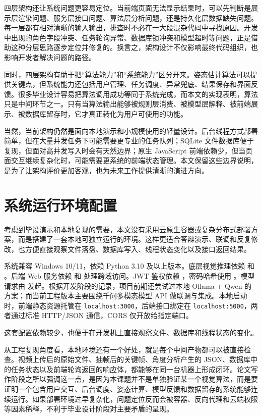 四层架构还让系统问题更容易定位。当前端页面无法显示结果时，可以先判断是展示层渲染问题、服务层接口问题、算法层分析问题，还是持久化层数据缺失问题。每一层都有相对清晰的输入输出，排查时不必在一大段混杂代码中寻找原因。开发中出现的角色字段冲突、任务轮询异常、数据库锁冲突和模型超时等问题，正是借助这种分层思路逐步定位并修复的。换言之，架构设计不仅影响最终代码组织，也影响开发者解决问题的路径。

同时，四层架构有助于把“算法能力”和“系统能力”区分开来。姿态估计算法可以提供关键点，但系统能力还包括用户管理、任务调度、异常兜底、结果保存和界面反馈。很多毕业设计容易把算法调用成功等同于系统完成，而本文的实现表明，算法只是中间环节之一。只有当算法输出能够被规则层消费、被模型层解释、被前端展示、被数据库留存时，它才真正转化为用户可使用的功能。

当然，当前架构仍然是面向本地演示和小规模使用的轻量设计。后台线程方式部署简单，但在大量并发任务下可能需要更专业的任务队列；SQLite 文件数据库便于复现，但面对高并发写入时会有天然边界；原生 JavaScript 前端依赖少，但当页面交互继续复杂化时，可能需要更系统的前端状态管理。本文保留这些边界说明，是为了让架构评价更加客观，也为未来工作提供清晰的演进方向。

\section{系统运行环境配置}
考虑到毕设演示和本地复现的需要，本文没有采用云原生容器或复杂分布式部署方案，而是搭建了一套本地可独立运行的环境。这样更适合答辩演示、联调和反复修改，也方便直接观察文件落盘、数据库写入、线程状态变化以及接口返回结果。

系统兼容 Windows 10/11，依赖 Python 3.10 及以上版本。底层视觉推理依赖  和 。后端 Web 服务依赖  和  处理跨域访问。JWT 鉴权依赖 ，密码哈希使用 。模型请求由  发起。根据开发阶段的记录，项目前期还尝试过本地 Ollama + Qwen 的方案；而当前工程版本主要围绕千问多模态模型 API 做联调与集成。本地启动时，前端静态资源托管在 \texttt{localhost:3000}，后端接口绑定在 \texttt{localhost:5000}，两者通过标准 HTTP/JSON 通信，CORS 仅开放给指定端口。

这套配置依赖较少，也便于在开发机上直接观察文件、数据库和线程状态的变化。

从工程复现角度看，本地环境还有一个好处，就是每个中间产物都可以被直接检查。视频上传后的原始文件、抽帧后的关键帧、角度分析产生的 JSON、数据库中的任务状态以及前端轮询返回的响应体，都能够在同一台机器上形成闭环。论文写作阶段之所以强调这一点，是因为本课题并不是单独验证某一个视觉算法，而是要证明一个包含用户交互、后台调度、姿态计算、模型反馈和数据留存的系统能够连续运行。如果部署环境过早复杂化，问题定位反而会被容器、反向代理和云端权限等因素稀释，不利于毕业设计阶段对主要矛盾的呈现。

